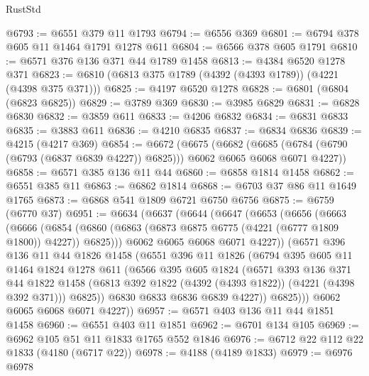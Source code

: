 \begin{lexlean}{RustStd}
\begin{coremodule}
{\begin{coremodule}
{{{{{{{{{{{{{{{{{{{{{{{{{{{{{{{@6793 := @6551 @379 @11 @1793
@6794 := @6556 @369
@6801 := @6794 @378 @605 @11 @1464 @1791 @1278 @611
@6804 := @6566 @378 @605 @1791
@6810 := @6571 @376 @136 @371 @44 @1789 @1458
@6813 := @4384 @6520 @1278 @371
@6823 := @6810 (@6813 @375 @1789 (@4392 (@4393 @1789)) (@4221 (@4398 @375 @371)))
@6825 := @4197 @6520 @1278
@6828 := @6801 (@6804 (@6823 @6825))
@6829 := @3789 @369
@6830 := @3985 @6829
@6831 := @6828 @6830
@6832 := @3859 @611
@6833 := @4206 @6832
@6834 := @6831 @6833
@6835 := @3883 @611
@6836 := @4210 @6835
@6837 := @6834 @6836
@6839 := @4215 (@4217 @369)
@6854 := @6672
    (@6675
      (@6682
        (@6685 (@6784 (@6790 (@6793 (@6837 @6839 @4227)) @6825)))
        @6062
        @6065
        @6068
        @6071
        @4227))
@6858 := @6571 @385 @136 @11 @44
@6860 := @6858 @1814 @1458
@6862 := @6551 @385 @11
@6863 := @6862 @1814
@6868 := @6703 @37 @86 @11 @1649 @1765
@6873 := @6868 @541 @1809 @6721 @6750 @6756
@6875 := @6759 (@6770 @37)
@6951 := @6634
    (@6637
      (@6644
        (@6647
          (@6653
            (@6656
              (@6663
                (@6666
                  (@6854
                    (@6860 (@6863 (@6873 @6875 @6775 (@4221 (@6777 @1809 @1800)) @4227)) @6825)))
                @6062
                @6065
                @6068
                @6071
                @4227))
            (@6571
              @396
              @136
              @11
              @44
              @1826
              @1458
              (@6551
                @396
                @11
                @1826
                (@6794
                  @395
                  @605
                  @11
                  @1464
                  @1824
                  @1278
                  @611
                  (@6566
                    @395
                    @605
                    @1824
                    (@6571
                      @393
                      @136
                      @371
                      @44
                      @1822
                      @1458
                      (@6813 @392 @1822 (@4392 (@4393 @1822)) (@4221 (@4398 @392 @371)))
                      @6825))
                  @6830
                  @6833
                  @6836
                  @6839
                  @4227))
              @6825)))
        @6062
        @6065
        @6068
        @6071
        @4227))
@6957 := @6571 @403 @136 @11 @44 @1851 @1458
@6960 := @6551 @403 @11 @1851
@6962 := @6701 @134 @105
@6969 := @6962 @105 @51 @11 @1833 @1765 @552 @1846
@6976 := @6712 @22 @112 @22 @1833 (@4180 (@6717 @22))
@6978 := @4188 (@4189 @1833)
@6979 := @6976 @6978
}}}}}}}}}}}}}}}}}}}}}}}}}}}}}}}
\end{coremodule}}
\end{coremodule}
\end{lexlean}
